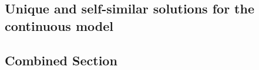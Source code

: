 \subsection{Unique and self-similar solutions for the continuous model}


% 

% 



\subsection{Combined Section}\label{sub:bestselfsimilar}

